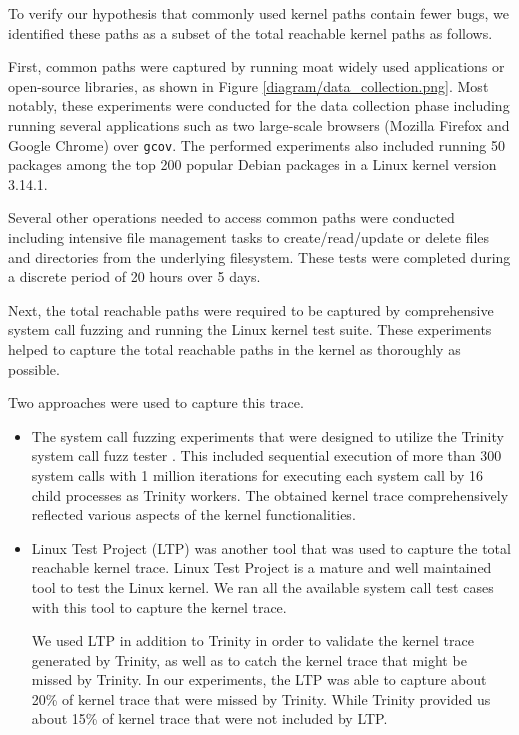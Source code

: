 To verify our hypothesis that commonly used kernel paths contain fewer bugs, 
we identified these paths as a subset of the total reachable kernel paths as follows.

First, common paths were captured by running moat widely used applications or open-source libraries, as shown in Figure \ref{diagram/data_collection.png}. Most notably, these experiments were conducted for the data collection phase including running several applications such as two large-scale browsers (Mozilla Firefox and Google Chrome) over \texttt{gcov}. The  performed experiments also included running 50 packages among the top 200 popular Debian packages \cite{Top-Packages} in a Linux kernel version 3.14.1.

Several other operations needed to access common paths were conducted including intensive file management tasks to create/read/update or delete files and directories from the underlying filesystem. These tests were completed during a discrete period of 20 hours over 5 days.

Next, the total reachable paths were required to be captured by comprehensive system call fuzzing and running the Linux kernel test suite. These experiments helped to capture the total reachable paths in the kernel as thoroughly as possible. 

Two approaches were used to capture this trace.

\begin{itemize}
\item The system call fuzzing experiments that were designed to utilize the Trinity system call fuzz tester \cite{Trinity}. This included sequential execution of more than 300 system calls with 1 million iterations for executing each system call by 16 child processes as Trinity workers. The obtained kernel trace comprehensively reflected various aspects of the kernel functionalities.


\item Linux Test Project (LTP) \cite{LTP} was another tool that was used to capture the total reachable kernel trace.
Linux Test Project is a mature and well maintained tool to test the Linux
kernel. 
We ran all the available system call test cases with this tool to capture
the kernel trace. 

We used LTP in addition to Trinity in order to validate the kernel trace generated 
by Trinity, as well as to catch the kernel trace that might be missed by Trinity. 
In our experiments, the LTP was able to capture about 20\% of kernel trace 
that were missed by Trinity. While Trinity provided us about 15\% of kernel trace 
that were not included by LTP. 
\end{itemize}

